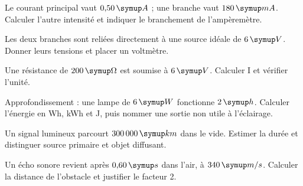 \par\noindent\begin{minipage}{\linewidth}
Le courant principal vaut $0{,}50\unite A$ ; une branche vaut $180\unite{mA}$. Calculer l’autre intensité et indiquer le branchement de l’ampèremètre.\par
\end{minipage}\par
\par\noindent\begin{minipage}{\linewidth}
Les deux branches sont reliées directement à une source idéale de $6\unite V$. Donner leurs tensions et placer un voltmètre.\par
\end{minipage}\par
\par\noindent\begin{minipage}{\linewidth}
Une résistance de $200\unite\Omega$ est soumise à $6\unite V$. Calculer I et vérifier l’unité.\par
\end{minipage}\par
\par\noindent\begin{minipage}{\linewidth}
Approfondissement : une lampe de $6\unite W$ fonctionne $2\unite h$. Calculer l’énergie en Wh, kWh et J, puis nommer une sortie non utile à l’éclairage.\par
\end{minipage}\par
{}\pcGrilleCourte{}
\label{sujet-B4}
\par\noindent\begin{minipage}{\linewidth}
Un signal lumineux parcourt $300\,000\unite{km}$ dans le vide. Estimer la durée et distinguer source primaire et objet diffusant.\par
\end{minipage}\par
\par\noindent\begin{minipage}{\linewidth}
Un écho sonore revient après $0{,}60\unite s$ dans l’air, à $340\unite{m/s}$. Calculer la distance de l’obstacle et justifier le facteur 2.\par
\end{minipage}\par
